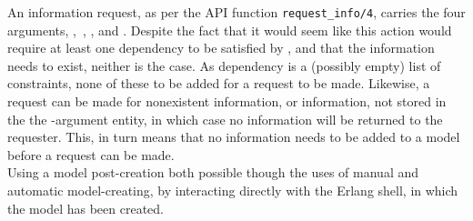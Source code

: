An information request, as per the API function \lstinline{request_info/4}, carries the four arguments, , , , and . Despite the fact that it would seem like this action would require at least one dependency to be satisfied by , and that the information needs to exist, neither is the case. As dependency is a (possibly empty) list of constraints, none of these  to be added for a request to be made. Likewise, a request can be made for nonexistent information, or information, not stored in the the -argument entity, in which case no information will be returned to the requester. This, in turn means that no information needs to be added to a model before a request can be made.\\[0.1cm]
Using a model post-creation both possible though the uses of manual and automatic model-creating, by interacting directly with the Erlang shell, in which the model has been created. 
